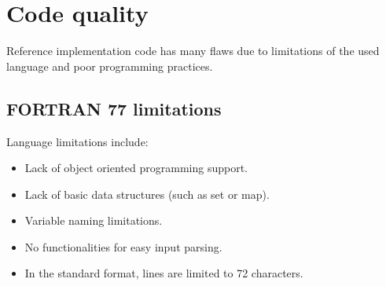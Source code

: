 \section{Code quality}

Reference implementation code has many flaws due to limitations of the used language and poor programming practices.

\subsection{FORTRAN 77 limitations}
Language limitations include:
\begin{itemize}
    \item Lack of object oriented programming support.
    \item Lack of basic data structures (such as set or map).
    \item Variable naming limitations.
    \item No functionalities for easy input parsing.
    \item In the standard format, lines are limited to 72 characters.
\end{itemize}

